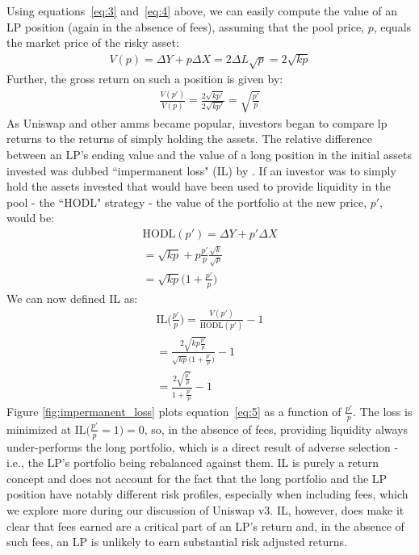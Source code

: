 \documentclass[11pt]{article}
\begin{document}
Using equations~\eqref{eq:3} and~\eqref{eq:4} above, we can easily compute the value of an LP position (again in the absence of fees), assuming that the pool price, $p$, equals the market price of the risky asset:
\begin{gather*}
    V(p) = \Delta Y + p \Delta X = 2 \Delta L \sqrt{p} = 2 \sqrt{k p}
\end{gather*}
Further, the gross return on such a position is given by:
\begin{gather*}
    \frac{V(p')}{V(p)} = \frac{2 \sqrt{k p'}}{2 \sqrt{k p'}} = \sqrt{\frac{p'}{p}}
\end{gather*}
As Uniswap and other \glspl{amm} became popular, investors began to compare \gls{lp} returns to the returns of simply holding the assets. The relative difference between an LP's ending value and the value of a long position in the initial assets invested was dubbed ``impermanent loss" (IL) by \citet{PintailMedium}. If an investor was to simply hold the assets invested that would have been used to provide liquidity in the pool - the ``HODL" strategy - the value of the portfolio at the new price, $p'$, would be:
\begin{gather*}
    \text{HODL}(p') = \Delta Y + p' \Delta X \\
    = \sqrt{kp} + p\frac{p'}{p} \frac{\sqrt{k}}{\sqrt{p}} \\
    = \sqrt{kp} \bigg( 1 + \frac{p'}{p} \bigg)
\end{gather*}
We can now defined IL as:
\begin{gather}
    \text{IL}\bigg( \frac{p'}{p} \bigg) = \frac{V(p')}{\text{HODL}(p')} - 1 \nonumber \\
    = \frac{2 \sqrt{k p \frac{p'}{p}}}{\sqrt{kp} \bigg( 1 + \frac{p'}{p} \bigg)} - 1 \nonumber \\
    = \frac{2 \sqrt{\frac{p'}{p}}}{1 + \frac{p'}{p}} - 1 \label{eq:5}
\end{gather}
Figure \ref{fig:impermanent_loss} plots equation~\eqref{eq:5} as a function of $\frac{p'}{p}$. The loss is minimized at $\text{IL}\bigl( \frac{p'}{p} = 1 \bigl) = 0$, so, in the absence of fees, providing liquidity always under-performs the long portfolio, which is a direct result of adverse selection - i.e., the LP's portfolio being rebalanced against them. IL is purely a return concept and does not account for the fact that the long portfolio and the LP position have notably different risk profiles, especially when including fees, which we explore more during our discussion of Uniswap v3. IL, however, does make it clear that fees earned are a critical part of an LP's return and, in the absence of such fees, an LP is unlikely to earn substantial risk adjusted returns.
\end{document}
